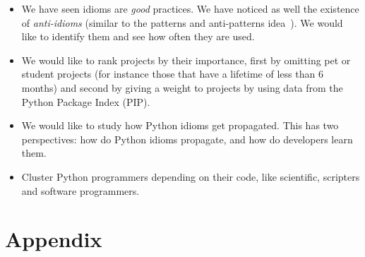 \documentclass[a4paper]{article}
\begin{document}
\begin{itemize}
  
  \item We have seen idioms are \emph{good} practices. We have noticed as well the existence of \emph{anti-idioms} (similar to the patterns and anti-patterns idea~\cite{brown1998antipatterns}). We would like to identify them and see how often they are used.
  
  \item We would like to rank projects by their importance, first by omitting pet or student projects (for instance those that have a lifetime of less than 6 months) and second by giving a weight to projects by using data from the Python Package Index (PIP).
  
  \item We would like to study how Python idioms get propagated. This has two perspectives: how do Python idioms propagate, and how do developers learn them.
  
  \item Cluster Python programmers depending on their code, like scientific, scripters and software programmers.

\end{itemize}

 





\section{Appendix}
\appendix
\end{document}
